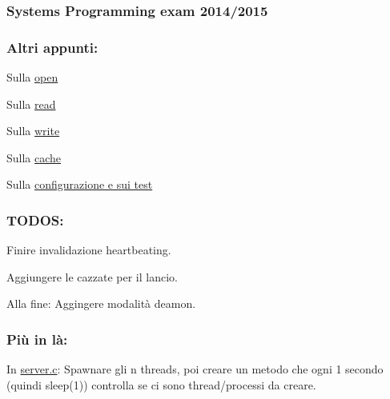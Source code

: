\subsubsection*{Systems Programming exam 2014/2015}

\subsubsection*{Altri appunti\+:}


\begin{DoxyItemize}
\item Sulla \hyperlink{md_OPE}{open}
\item Sulla \hyperlink{md_READ}{read}
\item Sulla \hyperlink{md_WRITE}{write}
\item Sulla \hyperlink{md_Cache}{cache}
\item Sulla \hyperlink{md_Test}{configurazione e sui test}
\end{DoxyItemize}

\subsubsection*{T\+O\+D\+O\+S\+:}


\begin{DoxyItemize}
\item Finire invalidazione heartbeating.
\item Aggiungere le cazzate per il lancio.
\item Alla fine\+: Aggingere modalità deamon.
\end{DoxyItemize}

\subsubsection*{Più in là\+:}


\begin{DoxyItemize}
\item In \hyperlink{server_8c}{server.\+c}\+: Spawnare gli n threads, poi creare un metodo che ogni 1 secondo (quindi sleep(1)) controlla se ci sono thread/processi da creare. 
\end{DoxyItemize}